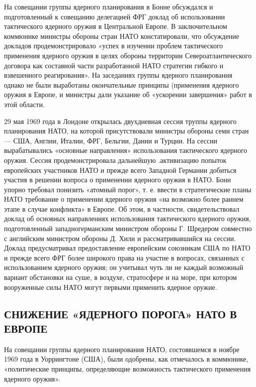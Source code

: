 \documentclass[12pt, a4paper, openany]{book}
\begin{document}
	На совещании группы ядерного планирования в Бонне обсуждался и подготовленный к совещанию делегацией ФРГ доклад об использовании тактического ядерного оружия в Центральной Европе. В заключительном коммюнике министры обороны стран НАТО констатировали, что обсуждение докладов продемонстрировало «успех в изучении проблем тактического применения ядерного оружия в целях обороны территории Североатлантического договора как составной части разработанной НАТО стратегии гибкого и взвешенного реагирования». На заседаниях группы ядерного планирования однако не были выработаны окончательные принципы (применения ядерного оружия в Европе, и министры дали указание об «ускорении завершения» работ в этой области.
	
	29 мая 1969 года в Лондоне открылась двухдневная сессия труппы ядерного планирования НАТО, на которой присутствовали министры обороны семи стран — США, Англии, Италии, ФРГ, Бельгии, Дании и Турции. На сессии вырабатывались «основные направления» использования тактического ядерного оружия. Сессия продемонстрировала дальнейшую .активизацию попыток европейских участников НАТО и прежде всего Западной Германии добиться участия в решении вопроса о применении ядерного оружия в НАТО. Бонн упорно требовал понизить «атомный порог», т. е. ввести в стратегические планы НАТО требование о применении ядерного оружия «на возможно более раннем этапе в случае конфликта» в Европе. Об этом, в частности, свидетельствовал доклад об основных направлениях использования тактического ядерного оружия, подготовленный западногерманским министром обороны Г. Шредером совместно с английским министром обороны Д. Хили и рассматривавшийся на сессии. Доклад предусматривал предоставление европейским союзникам США по НАТО и прежде всего ФРГ более широкого права на участие в вопросах, связанных с использованием ядерного оружия; он учитывал чуть ли не каждый возможный вариант обстановки на суше, в воздухе, стратосфере и на море, при котором вооруженные силы НАТО могут первыми применить ядерное оружие.
	
	\subsection[Снижение «ядерного порога» НАТО в Европе]{\center СНИЖЕНИЕ «ЯДЕРНОГО ПОРОГА» НАТО В ЕВРОПЕ}	

	
	На совещании группы ядерного планирования НАТО, состоявшемся в ноябре 1969 года в Уоррингтоне (США), были одобрены, как отмечалось в коммюнике, «политические принципы, определяющие возможность тактического применения ядерного оружия».
	
\end{document}
